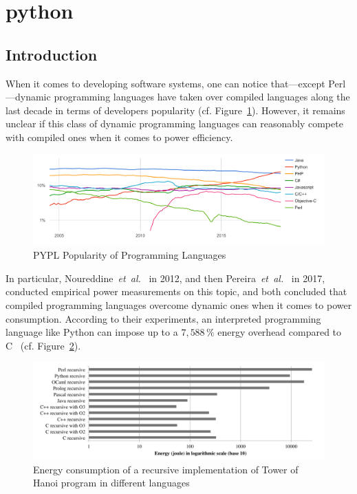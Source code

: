 \newpage
\section{python}

\subsection{Introduction}

When it comes to developing software systems, one can notice that---except Perl---dynamic programming languages have taken over compiled languages along the last decade in terms of developers popularity (cf. Figure~\ref{fig:pypl}).
However, it remains unclear if this class of dynamic programming languages can reasonably compete with compiled ones when it comes to power efficiency.

\begin{figure}[htbp]
    \includegraphics[width=\linewidth]{imgs/programminglanguangespopularity.png}
    \caption{PYPL Popularity of Programming Languages~\cite{noauthor_pypl_nodate}}
    \label{fig:pypl}
\end{figure}

In particular, Noureddine~\emph{et~al.}~\cite{noureddine_preliminary_2012} in 2012, and then Pereira~\emph{et~al.}~\cite{pereira_energy_2017} in 2017, conducted empirical power measurements on this topic, and both concluded that compiled programming languages overcome dynamic ones when it comes to power consumption.
According to their experiments, an interpreted programming language like Python can impose up to a $7,588\,\%$ energy overhead compared to C~\cite{pereira_energy_2017} (cf. Figure~\ref{fig:hannoi}).

\begin{figure}[htbp]
    \includegraphics[width=\linewidth]{imgs/hannoiimplementation.png}
    \caption{Energy consumption of a recursive implementation of Tower of Hanoi program in different languages~\cite{noureddine_preliminary_2012}}
    \label{fig:hannoi}
\end{figure}
